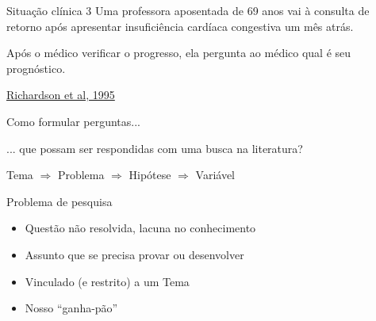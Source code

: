\documentclass{beamer}
\begin{document}
\begin{frame}
  \begin{exampleblock}{Situação clínica 3}
    \footnotesize
    Uma professora aposentada de 69 anos vai à consulta de retorno após apresentar insuficiência cardíaca congestiva um mês atrás.

    \bigskip
    Após o médico verificar o progresso, ela pergunta ao médico qual é seu prognóstico.
  \end{exampleblock}

  \vfill
  \scriptsize
  \hfill \href{https://acpjc.acponline.org/Content/123/3/issue/ACPJC-1995-123-3-A12.htm}
      {Richardson et al, 1995}
\end{frame}

\begin{frame}
  \begin{center}
    Como formular perguntas...

    \bigskip
    ... que possam ser respondidas com uma busca na literatura?
  \end{center}
\end{frame}

\begin{frame}
  \begin{center}
    Tema $\Rightarrow$ Problema $\Rightarrow$ Hipótese $\Rightarrow$ Variável

    \bigskip
  \end{center}
\end{frame}

\begin{frame}{Problema de pesquisa}
  \begin{itemize}
    \footnotesize
  \item Questão não resolvida, lacuna no conhecimento
    \bigskip
  \item Assunto que se precisa provar ou desenvolver
    \bigskip
  \item Vinculado (e restrito) a um Tema
    \bigskip
  \item Nosso ``ganha-pão''
  \end{itemize}
\end{frame}
\end{document}
